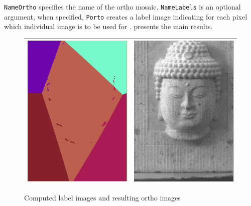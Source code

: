 {\tt NameOrtho} specifies the name of the ortho mosaic. {\tt NameLabels} is an optional
argument, when specified, {\tt Porto} creates a label image indicating for each pixel which
individual  image is to be used for .   %
presents the main results.


\begin{figure}
\begin{tabular}{||c|c||}
   \hline \hline
   \includegraphics[width=80mm]{FIGS/Boudhas/Label-Test-Redr.jpg}   &
   \includegraphics[width=80mm]{FIGS/Boudhas/Ortho-NonEg-Test-Redr.jpg}   \\ \hline  \hline
\end{tabular}
\label{Resul:Ortho}
\caption{Computed label images and resulting ortho images}
\end{figure}



